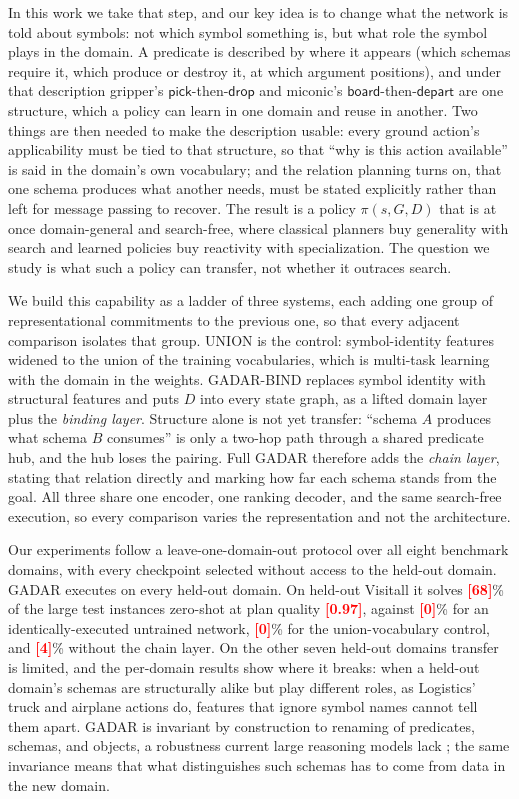\documentclass[letterpaper]{article} %
\newcommand{\gadar}{GADAR}                 %
\newcommand{\gadarbind}{\gadar{}-BIND}     %
\newcommand{\union}{UNION}                 %
\newcommand{\todonum}[1]{\textcolor{red}{\textbf{[#1]}}}
\begin{document}
In this work we take that step, and our key idea is to change what the
network is told about symbols: not which symbol something is, but what role
the symbol plays in the domain. A predicate is described by where it
appears (which schemas require it, which produce or destroy it, at which
argument positions), and under that description gripper's
$\textsf{pick}$-then-$\textsf{drop}$ and miconic's
$\textsf{board}$-then-$\textsf{depart}$ are one structure, which a policy
can learn in one domain and reuse in another. Two things are then needed to
make the description usable: every ground action's applicability must be
tied to that structure, so that ``why is this action available'' is said in
the domain's own vocabulary; and the relation planning turns on, that one
schema produces what another needs, must be stated explicitly rather than
left for message passing to recover. The result is a policy
$\pi(s, G, D)$ that is at once domain-general and search-free, where
classical planners buy generality with search and learned policies buy
reactivity with specialization. The question we study is what such a policy
can transfer, not whether it outraces search.

We build this capability as a ladder of three systems, each adding one
group of representational commitments to the previous one, so that every
adjacent comparison isolates that group. \union{} is the control: symbol-identity
features widened to the union of the training vocabularies,
which is multi-task learning with the domain in the weights. \gadarbind{}
replaces symbol identity with structural features and puts $D$ into every
state graph, as a lifted domain layer plus the \emph{binding layer}.
Structure alone is not yet transfer: ``schema $A$ produces what schema $B$
consumes'' is only a two-hop path through a shared predicate hub, and the
hub loses the pairing. Full \gadar{} therefore adds the \emph{chain
layer}, stating that relation directly and marking how far each schema
stands from the goal. All three share one encoder, one ranking decoder, and the
same search-free execution, so every comparison varies the representation
and not the architecture.

Our experiments follow a leave-one-domain-out protocol over all eight
benchmark domains, with every checkpoint selected without access to the
held-out domain. \gadar{} executes on every held-out domain. On held-out
Visitall it solves \todonum{68}\% of the large test instances zero-shot at
plan quality \todonum{0.97}, against \todonum{0}\% for an
identically-executed untrained network, \todonum{0}\% for the
union-vocabulary control, and \todonum{4}\% without the chain layer. On the
other seven held-out domains transfer is limited, and the per-domain
results show where it breaks: when a held-out domain's schemas are
structurally alike but play different roles, as Logistics' truck and
airplane actions do, features that ignore symbol names cannot tell them
apart. \gadar{} is invariant by construction to renaming of predicates,
schemas, and objects, a robustness current large reasoning models lack
\citep{llm_baseline}; the same invariance means that what distinguishes
such schemas has to come from data in the new domain.
\end{document}
